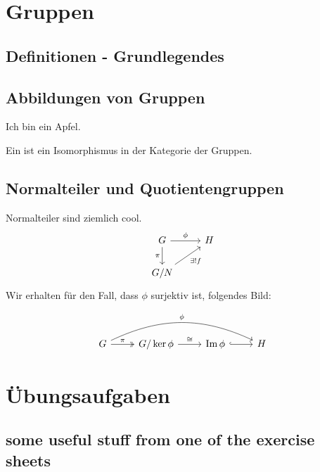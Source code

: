 \documentclass[11pt,twoside]{memoir}
\begin{document}
	
\frontmatter
\maketitle
\begin{KeepFromToc}
	\tableofcontents
\end{KeepFromToc}

\mainmatter
\chapter{Gruppen}

\section{Definitionen - Grundlegendes}
\lipsum[1-5]
\section{Abbildungen von Gruppen}
\lipsum[1]
\begin{lem}\label{thm:Apfel}
	Ich bin ein Apfel.
\end{lem}
\lec

\begin{defn}
	Ein  ist ein Isomorphismus in der Kategorie der Gruppen. 
\end{defn}
\newpage
\section{Normalteiler und Quotientengruppen}
\begin{prop}
	Normalteiler sind ziemlich cool.
	\[
	\begin{tikzcd}
	G \ar{r}{\phi} \ar[swap]{d}{\pi} & H\\
	G/N \ar[swap]{ur}{\exists! f}
	\end{tikzcd}
	\]
	Wir erhalten für den Fall, dass $\phi$ surjektiv ist, folgendes Bild:

	\[
	\begin{tikzcd}
	G \ar[\surarr]{r}{\pi}  \ar[bend left = 25]{rrr}{\phi}& G/\ker\phi \ar{r}{\cong} & \im \phi \ar[\embarr]{r}{} & H
	\end{tikzcd}
	\]
\end{prop}
\lec
\thispagestyle{rlast}

\appendix
\chapter{Übungsaufgaben}
\section{some useful stuff from one of the exercise sheets}
\backmatter
\printindex
\end{document}
